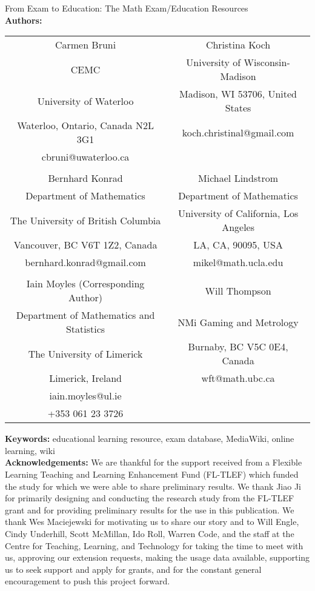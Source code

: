 \documentclass[10pt]{article}
\begin{document}
\begin{center}
{\LARGE From Exam to Education: The Math Exam/Education Resources}
\\[2cm]
\textbf{Authors:}
\\[0.5cm]
\begin{table}[H]
\centering
\begin{tabular}{cc}
Carmen Bruni					&	Christina Koch\\
CEMC							&	University of Wisconsin-Madison\\
University of Waterloo				&	Madison, WI 53706, United States\\
Waterloo, Ontario, Canada N2L 3G1		&koch.christinal@gmail.com\\
cbruni@uwaterloo.ca				&	\\\\
Bernhard Konrad					&	Michael Lindstrom\\
Department of Mathematics			&	Department of Mathematics\\
The University of British Columbia		&	University of California, Los Angeles\\
Vancouver, BC V6T 1Z2, Canada			&	LA, CA, 90095, USA\\
bernhard.konrad@gmail.com				&	mikel@math.ucla.edu \\\\
Iain Moyles (Corresponding Author)		&	Will Thompson\\
Department of Mathematics and Statistics	&	NMi Gaming and Metrology\\
The University of Limerick				&	Burnaby, BC V5C 0E4, Canada\\
Limerick, Ireland					&	wft@math.ubc.ca\\
iain.moyles@ul.ie					&	\\
+353 061 23 3726 					&
\end{tabular}
\end{table}
\end{center}
\textbf{Keywords:} educational learning resource, exam database, MediaWiki, online learning, wiki
\\[1cm]
\textbf{Acknowledgements:} We are thankful for the support received from a Flexible Learning Teaching and Learning Enhancement Fund (FL-TLEF) which funded the study for which we were able to share preliminary results.  We thank Jiao Ji for primarily designing and conducting the research study from the FL-TLEF grant and for providing preliminary results for the use in this publication.  We thank Wes Maciejewski for motivating us to share our story and to Will Engle, Cindy Underhill, Scott McMillan, Ido Roll, Warren Code, and the staff at the Centre for Teaching, Learning, and Technology for taking the time to meet with us, approving our extension requests, making the usage data available, supporting us to seek support and apply for grants, and for the constant general encouragement to push this project forward. 
\end{document}
